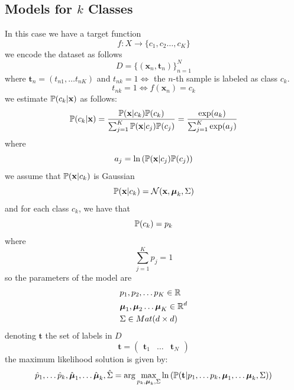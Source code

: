 \documentclass[10pt, letterpaper]{report}
\begin{document}
\bigskip
\subsection{Models for $k$ Classes}
In this case we have a target function\begin{equation}
	f:X\rightarrow\{c_1,c_2\dots,c_K\}
\end{equation}
we encode the dataset as follows\begin{equation}
	D=\{(\mathbf x_n,\mathbf t_n)\}_{n=1}^N
\end{equation}
where $\mathbf t_n=(t_{n1},\dots t_{nK})$ and $t_{nk}=1\iff$ the $n$-th sample is labeled as class $c_k$.\begin{equation}
	t_{nk}=1\iff f(\mathbf x_n)=c_k
\end{equation}
we estimate ${\mathbb P}(c_k|\mathbf x)$ as follows:\begin{equation}
	{\mathbb P}(c_k|\mathbf x)=\frac{{\mathbb P}(\mathbf x|c_k){\mathbb P}(c_k)}{\sum_{j=1}^K{\mathbb P}(\mathbf x|c_j){\mathbb P}(c_j)}=\frac{\exp(a_k)}{\sum_{j=1}^K\exp(a_j)}
\end{equation}
where\begin{equation}
	a_j=\ln\left({\mathbb P}(\mathbf x|c_j){\mathbb P}(c_j)\right)
\end{equation}
we assume that ${\mathbb P}(\mathbf x|c_k)$ is Gaussian\begin{equation}
	{\mathbb P}(\mathbf x|c_k)=\mathcal N(\mathbf x,{\boldsymbol{\mu}}_k,\Sigma)
\end{equation}
and for each class $c_k$, we have that\begin{equation}
	{\mathbb P}(c_k)=p_k
\end{equation}
where \begin{equation}
	\sum_{j=1}^Kp_j=1
\end{equation}
so the parameters of the model are\begin{align}
	 & p_1,p_2,\dots p_K\in {\mathbb R}          \\
	 & {\boldsymbol{\mu}}_1,{\boldsymbol{\mu}}_2\dots {\boldsymbol{\mu}}_K\in{\mathbb R}^d \\
	 & \Sigma\in Mat(d\times d)
\end{align}
denoting $\mathbf t$ the set of labels in $D$\begin{equation}
	\mathbf t = \begin{pmatrix}
		\mathbf t_1 & \dots & \mathbf t_N
	\end{pmatrix}
\end{equation}
the maximum likelihood solution is given by:\begin{equation}
	\hat p_1,\dots \hat p_k,\hat {{\boldsymbol{\mu}}}_1,\dots \hat {{\boldsymbol{\mu}}}_k,\hat \Sigma=\arg\max_{p_k,{\boldsymbol{\mu}}_k,\Sigma}\ln\left(
	{\mathbb P}(\mathbf t|p_1,\dots p_k,{\boldsymbol{\mu}}_1,\dots {\boldsymbol{\mu}}_k,\Sigma)
	\right)
\end{equation}
\end{document}
